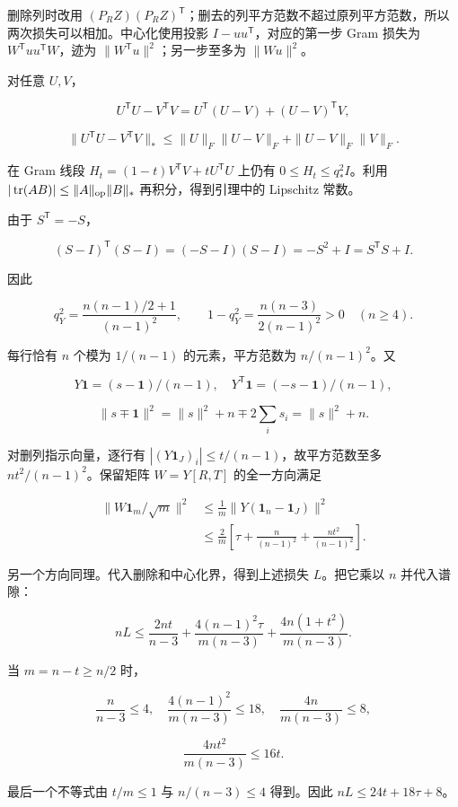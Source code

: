 \documentclass[11pt,a4paper]{article}
\begin{document}
删除列时改用 \((P_RZ)(P_RZ)^{\mathsf T}\)；删去的列平方范数不超过原列平方范数，所以两次损失可以相加。中心化使用投影 \(I-uu^{\mathsf T}\)，对应的第一步 Gram 损失为 \(W^{\mathsf T}uu^{\mathsf T}W\)，迹为 \(\|W^{\mathsf T}u\|^2\)；另一步至多为 \(\|Wu\|^2\)。

对任意 \(U,V\)，

\[U^{\mathsf T}U-V^{\mathsf T}V
=U^{\mathsf T}(U-V)+(U-V)^{\mathsf T}V,\]

\[\|U^{\mathsf T}U-V^{\mathsf T}V\|_*
\le\|U\|_F\|U-V\|_F+\|U-V\|_F\|V\|_F.\]

在 Gram 线段 \(H_t=(1-t)V^{\mathsf T}V+tU^{\mathsf T}U\) 上仍有 \(0\le H_t\le q_*^2I\)。利用 \(|\operatorname{tr}(AB)|\le\|A\|_{\rm op}\|B\|_*\) 再积分，得到引理中的 Lipschitz 常数。

由于 \(S^{\mathsf T}=-S\)，

\[(S-I)^{\mathsf T}(S-I)=(-S-I)(S-I)=-S^2+I=S^{\mathsf T}S+I.\]

因此

\[q_Y^2=\frac{n(n-1)/2+1}{(n-1)^2},\qquad
1-q_Y^2=\frac{n(n-3)}{2(n-1)^2}>0\quad(n\ge4).\]

每行恰有 \(n\) 个模为 \(1/(n-1)\) 的元素，平方范数为 \(n/(n-1)^2\)。又

\[Y\mathbf1=(s-\mathbf1)/(n-1),\quad
Y^{\mathsf T}\mathbf1=(-s-\mathbf1)/(n-1),\]

\[\|s\mp\mathbf1\|^2=\|s\|^2+n\mp2\sum_i s_i=\|s\|^2+n.\]

对删列指示向量，逐行有 \(|(Y\mathbf1_J)_i|\le t/(n-1)\)，故平方范数至多 \(nt^2/(n-1)^2\)。保留矩阵 \(W=Y[R,T]\) 的全一方向满足

\[\begin{aligned}
\|W\mathbf1_m/\sqrt m\|^2
&\le\frac1m\|Y(\mathbf1_n-\mathbf1_J)\|^2\\
&\le\frac2m\left[\tau+\frac n{(n-1)^2}+\frac{nt^2}{(n-1)^2}\right].
\end{aligned}\]

另一个方向同理。代入删除和中心化界，得到上述损失 \(L\)。把它乘以 \(n\) 并代入谱隙：

\[nL\le\frac{2nt}{n-3}
+\frac{4(n-1)^2\tau}{m(n-3)}
+\frac{4n(1+t^2)}{m(n-3)}.\]

当 \(m=n-t\ge n/2\) 时，

\[\frac n{n-3}\le4,\quad
\frac{4(n-1)^2}{m(n-3)}\le18,\quad
\frac{4n}{m(n-3)}\le8,\]

\[\frac{4nt^2}{m(n-3)}\le16t.\]

最后一个不等式由 \(t/m\le1\) 与 \(n/(n-3)\le4\) 得到。因此 \(nL\le24t+18\tau+8\)。
\end{document}

